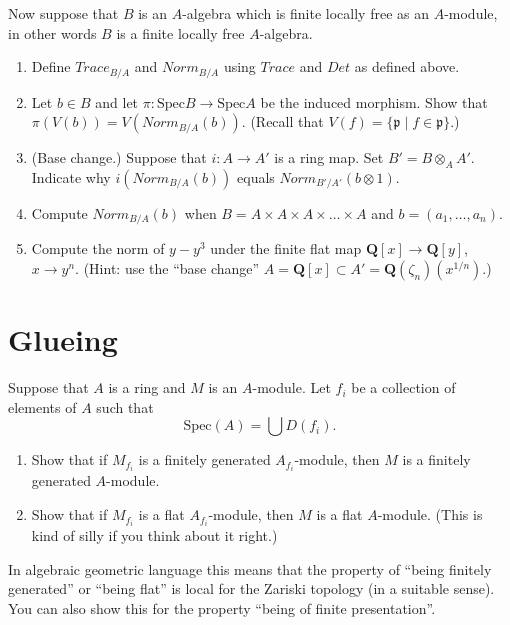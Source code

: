 \begin{exercise}
Now suppose that $B$ is an $A$-algebra which is finite
locally free as an $A$-module, in other words $B$ is a finite locally
free $A$-algebra.
\begin{enumerate}
\item Define $Trace_{B/A}$ and $Norm_{B/A}$ using
$Trace$ and $Det$ as defined above.
\item Let $b\in B$ and let $\pi : \text{Spec} B \to \text{Spec} A$ be
the induced morphism. Show that $\pi(V(b)) = V(Norm_{B/A}(b))$.
(Recall that $V(f) = \{ {\mathfrak p} \mid f \in {\mathfrak p}\}$.)
\item (Base change.) Suppose that $i:A \to A'$ is a ring map. Set
$B' = B\otimes_A A'$. Indicate why $i(Norm_{B/A}(b))$ equals
$Norm_{B'/A'}(b\otimes 1)$.
\item Compute $Norm_{B/A}(b)$ when
$B = A\times A\times A \times\ldots\times A$
and $b = (a_1,\ldots,a_n)$.
\item Compute the norm of $y-y^3$ under the finite flat
map ${\mathbf Q}[x] \to {\mathbf Q}[y]$, $x \to y^n$. (Hint: use
the ``base change''
$A = {\mathbf Q}[x] \subset A' = {\mathbf Q}(\zeta_n)(x^{1/n})$.)
\end{enumerate}
\end{exercise}



\section{Glueing}
\label{section-glueing}

\begin{exercise}
Suppose that $A$ is a ring and $M$ is an $A$-module.
Let $f_i$ be a collection of elements of $A$ such that
$$
\text{Spec}(A) = \bigcup D(f_i).
$$
\begin{enumerate}
\item Show that if $M_{f_i}$ is a finitely generated $A_{f_i}$-module,
then $M$ is a finitely generated $A$-module.
\item Show that if $M_{f_i}$ is a flat $A_{f_i}$-module,
then $M$ is a flat $A$-module. (This is kind of silly if you think about
it right.)
\end{enumerate}
\end{exercise}

\begin{remark}
In algebraic geometric language this means that the property 
of ``being finitely generated'' or ``being flat'' is local for the Zariski
topology (in a suitable sense). You can also show this for the property
``being of finite presentation''.
\end{remark}





